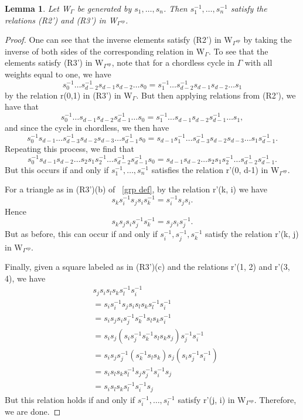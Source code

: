 \documentclass[11pt]{amsart}
\newtheorem{lem}[thm]{Lemma}
\theoremstyle{definition}
\begin{document}
\begin{lem}\label{lem:op_homomorphism}
Let W$_{\Gamma}$ be generated by $s_{1}, \dots, s_{n}$. Then $s_{1}^{-1}, \dots, s_{n}^{-1}$ satisfy the relations (R2') and (R3') in W$_{\Gamma^{op}}$.
\end{lem}
\begin{proof}
One can see that the inverse elements satisfy (R2') in W$_{\Gamma^{op}}$ by taking the inverse of both sides of the corresponding relation in W$_{\Gamma}$. To see that the elements satisfy (R3') in W$_{\Gamma^{op}}$, note that for a chordless cycle in $\Gamma$ with all weights equal to one, we have $$s_{0}^{-1}\dots s_{d-2}^{-1}s_{d-1}s_{d-2}\dots s_{0} = s_{1}^{-1}\dots s_{d-2}^{-1}s_{d-1}s_{d-2}\dots s_{1}$$ by the relation r(0,1) in (R3') in W$_{\Gamma}$. But then applying relations from (R2'), we have that $$s_{0}^{-1}\dots s_{d-1}s_{d-2}s_{d-1}^{-1}\dots s_{0} = s_{1}^{-1}\dots s_{d-1}s_{d-2}s_{d-1}^{-1}\dots s_{1},$$ and since the cycle in chordless, we then have $$s_{0}^{-1}s_{d-1}\dots s_{d-3}^{-1}s_{d-2}s_{d-3}\dots s_{d-1}^{-1}s_{0} = s_{d-1}s_{1}^{-1}\dots s_{d-3}^{-1}s_{d-2}s_{d-3}\dots s_{1}s_{d-1}^{-1}.$$ Repeating this process, we find that $$s_{0}^{-1}s_{d-1}s_{d-2}\dots s_{2}s_{1}s_{2}^{-1}\dots s_{d-2}^{-1}s_{d-1}^{-1}s_{0} = s_{d-1}s_{d-2}\dots s_{2}s_{1}s_{2}^{-1}\dots s_{d-2}^{-1}s_{d-1}^{-1}.$$ But this occurs if and only if $s_{1}^{-1}, \dots, s_{n}^{-1}$ satisfies the relation r'(0, d-1) in W$_{\Gamma^{op}}.$ 

For a triangle as in (R3')(b) of ~\ref{grp def}, by the relation r'(k, i) we have $$s_{k}s_{i}^{-1}s_{j}s_{i}s_{k}^{-1} = s_{i}^{-1}s_{j}s_{i}.$$ Hence $$s_{k}s_{j}s_{i}s_{j}^{-1}s_{k}^{-1} = s_{j}s_{i}s_{j}^{-1}.$$ But as before, this can occur if and only if $s_{i}^{-1}, s_{j}^{-1}, s_{k}^{-1}$ satisfy the relation r'(k, j) in W$_{\Gamma^{op}}$.

Finally, given a square labeled as in (R3')(c) and the relations r'(1, 2) and r'(3, 4), we have 
\begin{align*}
& s_{j}s_{i}s_{l}s_{k}s_{l}^{-1}s_{i}^{-1} \\
&= s_{i}s_{i}^{-1}s_{j}s_{i}s_{l}s_{k}s_{l}^{-1}s_{i}^{-1} \\
&= s_{i}s_{j}s_{i}s_{j}^{-1}s_{k}^{-1}s_{l}s_{k}s_{i}^{-1} \\
&= s_{i}s_{j}(s_{i}s_{j}^{-1}s_{k}^{-1}s_{l}s_{k}s_{j})s_{j}^{-1}s_{i}^{-1} \\
&= s_{i}s_{j}s_{j}^{-1}(s_{k}^{-1}s_{l}s_{k})s_{j}(s_{i}s_{j}^{-1}s_{i}^{-1}) \\
&= s_{i}s_{l}s_{k}s_{l}^{-1}s_{j}s_{j}^{-1}s_{i}^{-1}s_{j} \\
&= s_{i}s_{l}s_{k}s_{l}^{-1}s_{i}^{-1}s_{j}
\end{align*}
But this relation holds if and only if $s_{i}^{-1}, \dots, s_{l}^{-1}$ satisfy r'(j, i) in W$_{\Gamma^{op}}$. Therefore, we are done.
\end{proof}
\end{document}

